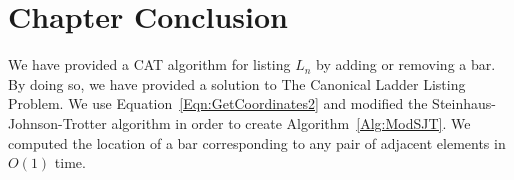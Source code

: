  \begin{center}
    \begin{table}[ht]
      \centering
      \caption{The table with the runtimes for listing $L_{n}$ using {\sc ModifiedSJT}.}

    \label{Table:ListingResults}
    \end{table}
  \end{center}


  \section{Chapter Conclusion}
  We have provided a CAT algorithm for listing $L_{n}$ by adding or removing a bar. By doing so, we 
  have provided a solution to The Canonical Ladder Listing Problem. We use Equation~\ref{Eqn:GetCoordinates2} and modified the 
  Steinhaus-Johnson-Trotter algorithm in order to create Algorithm~\ref{Alg:ModSJT}. We computed the location of a bar corresponding 
  to any pair of adjacent elements in $O(1)$ time.\par 
  







